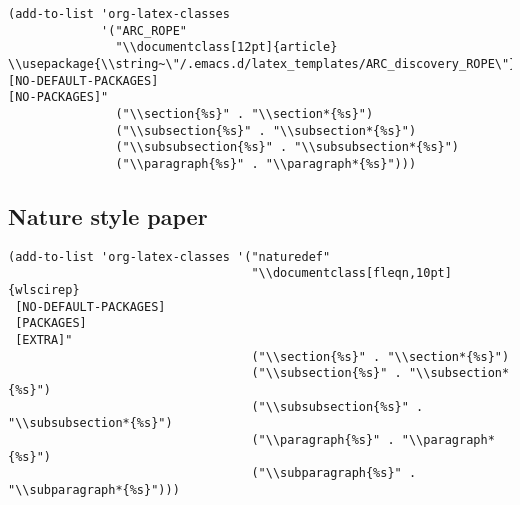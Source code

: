\documentclass[12pt]{article}
\begin{document}
\begin{verbatim}
(add-to-list 'org-latex-classes
             '("ARC_ROPE"
               "\\documentclass[12pt]{article}
\\usepackage{\\string~\"/.emacs.d/latex_templates/ARC_discovery_ROPE\"}
[NO-DEFAULT-PACKAGES]
[NO-PACKAGES]"
               ("\\section{%s}" . "\\section*{%s}")
               ("\\subsection{%s}" . "\\subsection*{%s}")
               ("\\subsubsection{%s}" . "\\subsubsection*{%s}")
               ("\\paragraph{%s}" . "\\paragraph*{%s}")))
\end{verbatim}



\subsection{Nature style paper}
\label{sec:org866e518}

\begin{verbatim}
(add-to-list 'org-latex-classes '("naturedef"
                                  "\\documentclass[fleqn,10pt]{wlscirep}
 [NO-DEFAULT-PACKAGES]
 [PACKAGES]
 [EXTRA]"
                                  ("\\section{%s}" . "\\section*{%s}")
                                  ("\\subsection{%s}" . "\\subsection*{%s}")
                                  ("\\subsubsection{%s}" . "\\subsubsection*{%s}")
                                  ("\\paragraph{%s}" . "\\paragraph*{%s}")
                                  ("\\subparagraph{%s}" . "\\subparagraph*{%s}")))
\end{verbatim}
\end{document}
